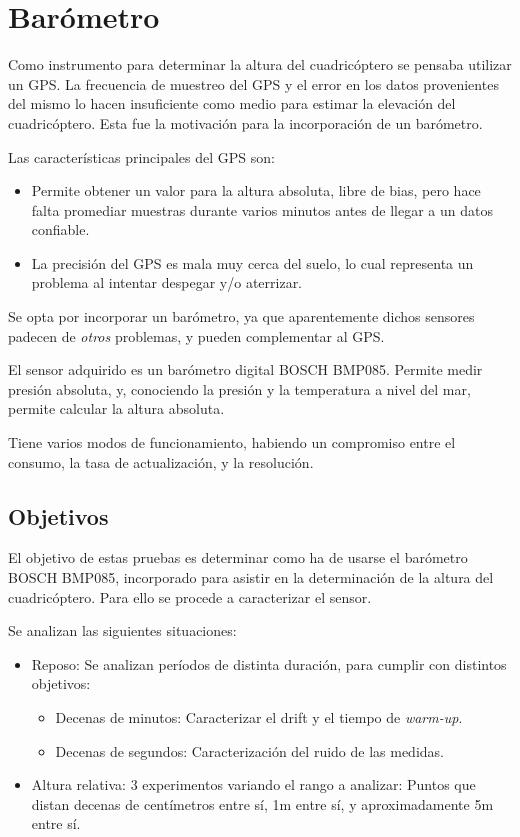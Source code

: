 \documentclass[main]{subfiles}
\begin{document}
\chapter{Bar\'ometro}
\label{chap:barometro}

Como instrumento para determinar la altura del cuadric\'optero se pensaba utilizar un GPS. La frecuencia de muestreo del GPS y el error en los datos provenientes del mismo lo hacen insuficiente como medio para estimar la elevaci\'on del cuadric\'optero. Esta fue la motivaci\'on para la incorporaci\'on de un bar\'ometro.

Las caracter\'isticas principales del GPS son:
\begin{itemize}
\item Permite obtener un valor para la altura absoluta, libre de bias, pero hace falta promediar muestras durante varios minutos antes de llegar a un datos confiable.
\item  La precisi\'on del GPS es mala muy cerca del suelo, lo cual representa un problema al intentar despegar y/o aterrizar.
\end{itemize}

Se opta por incorporar un bar\'ometro, ya que aparentemente dichos sensores padecen de \textit{otros} problemas, y pueden complementar al GPS.

El sensor adquirido es un bar\'ometro digital BOSCH BMP085. Permite medir presi\'on absoluta, y, conociendo la presi\'on y la temperatura a nivel del mar, permite calcular la altura absoluta.

Tiene varios modos de funcionamiento, habiendo un compromiso entre el consumo, la tasa de actualizaci\'on, y la resoluci\'on.

\section{Objetivos}

El objetivo de estas pruebas es determinar como ha de usarse el bar\'ometro BOSCH BMP085, incorporado para asistir en la determinaci\'on de la altura del cuadric\'optero. Para ello se procede a caracterizar el sensor.

Se analizan las siguientes situaciones:

\begin{itemize}
\item Reposo: Se analizan per\'iodos de distinta duraci\'on, para cumplir con distintos objetivos:
  \begin{itemize}
  \item Decenas de minutos: Caracterizar el drift y el tiempo de \textit{warm-up}.
  \item Decenas de segundos: Caracterizaci\'on del ruido de las medidas.
  \end{itemize}
\item Altura relativa: 3 experimentos variando el rango a analizar: Puntos que distan decenas de cent\'imetros entre s\'i, 1m entre s\'i, y aproximadamente 5m entre s\'i.
\end{itemize}
\end{document}
